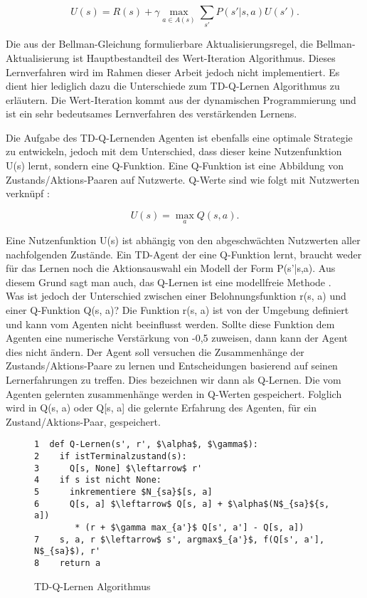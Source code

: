 \begin{equation}
U(s) = R(s) + \gamma \max_{a \in A(s)} \sum_{s'} P(s'|s, a) U(s').
\end{equation}

Die aus der Bellman-Gleichung formulierbare Aktualisierungsregel, die Bellman-Aktualisierung ist Hauptbestandteil des Wert-Iteration Algorithmus. Dieses Lernverfahren wird im Rahmen dieser Arbeit jedoch nicht implementiert. Es dient hier lediglich dazu die Unterschiede zum TD-Q-Lernen Algorithmus zu erläutern. Die Wert-Iteration kommt aus der dynamischen Programmierung und ist ein sehr bedeutsames Lernverfahren des verstärkenden Lernens.

Die Aufgabe des TD-Q-Lernenden Agenten ist ebenfalls eine optimale Strategie zu entwickeln, jedoch mit dem Unterschied, dass dieser keine Nutzenfunktion U(s) lernt, sondern eine Q-Funktion. Eine Q-Funktion ist eine Abbildung von Zustands/Aktions-Paaren auf Nutzwerte. Q-Werte sind wie folgt mit Nutzwerten verknüpf \cite[973]{Russell}:

\begin{equation}
U(s) = \max_a Q(s,a).
\end{equation}

Eine Nutzenfunktion U(s) ist abhängig von den abgeschwächten Nutzwerten aller nachfolgenden Zustände. Ein TD-Agent der eine Q-Funktion lernt, braucht weder für das Lernen noch die Aktionsauswahl ein Modell der Form P(s'|s,a). Aus diesem Grund sagt man auch, das Q-Lernen ist eine modellfreie Methode \cite[974]{Russell}. \\

Was ist jedoch der Unterschied zwischen einer Belohnungsfunktion r(s, a) und einer Q-Funktion Q(s, a)? Die Funktion r(s, a) ist von der Umgebung definiert und kann vom Agenten nicht beeinflusst werden. Sollte diese Funktion dem Agenten eine numerische Verstärkung von -0,5 zuweisen, dann kann der Agent dies nicht ändern. Der Agent soll versuchen die Zusammenhänge der Zustands/Aktions-Paare zu lernen und Entscheidungen basierend auf seinen Lernerfahrungen zu treffen. Dies bezeichnen wir dann als Q-Lernen. Die vom Agenten gelernten zusammenhänge werden in Q-Werten gespeichert. Folglich wird in Q(s, a) oder Q[s, a] die gelernte Erfahrung des Agenten, für ein Zustand/Aktions-Paar, gespeichert. \\

\begin{figure}[!htbp]
\centering
\begin{lstlisting}[frame=single, mathescape=true]
1  def Q-Lernen(s', r', $\alpha$, $\gamma$):
2    if istTerminalzustand(s):
3      Q[s, None] $\leftarrow$ r'
4    if s ist nicht None:
5      inkrementiere $N_{sa}$[s, a]
6      Q[s, a] $\leftarrow$ Q[s, a] + $\alpha$(N$_{sa}${s, a])
  		* (r + $\gamma max_{a'}$ Q[s', a'] - Q[s, a])
7    s, a, r $\leftarrow$ s', argmax$_{a'}$, f(Q[s', a'], N$_{sa}$), r'
8    return a
\end{lstlisting}
\caption{TD-Q-Lernen Algorithmus}
\label{fig:TD-Q-Lernen Algorithmus}
\end{figure} 

